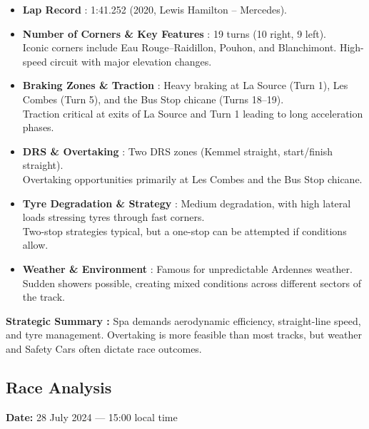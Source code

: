 \begin{itemize}
    \item \textbf{Lap Record} : 1:41.252 (2020, Lewis Hamilton – Mercedes).
    
    \item \textbf{Number of Corners \& Key Features} : 19 turns (10 right, 9 left). \\
    Iconic corners include Eau Rouge–Raidillon, Pouhon, and Blanchimont. High-speed circuit with major elevation changes.
    
    \item \textbf{Braking Zones \& Traction} : Heavy braking at La Source (Turn 1), Les Combes (Turn 5), and the Bus Stop chicane (Turns 18–19). \\
    Traction critical at exits of La Source and Turn 1 leading to long acceleration phases.
    
    \item \textbf{DRS \& Overtaking} : Two DRS zones (Kemmel straight, start/finish straight). \\
    Overtaking opportunities primarily at Les Combes and the Bus Stop chicane.
    
    \item \textbf{Tyre Degradation \& Strategy} : Medium degradation, with high lateral loads stressing tyres through fast corners. \\
    Two-stop strategies typical, but a one-stop can be attempted if conditions allow.
    
    \item \textbf{Weather \& Environment} : Famous for unpredictable Ardennes weather. \\
    Sudden showers possible, creating mixed conditions across different sectors of the track.
\end{itemize}

\textbf{Strategic Summary :} Spa demands aerodynamic efficiency, straight-line speed, and tyre management. Overtaking is more feasible than most tracks, but weather and Safety Cars often dictate race outcomes.

\subsection{Race Analysis}
\textbf{Date:} 28 July 2024 — 15:00 local time


